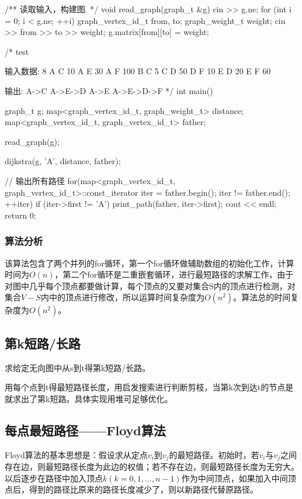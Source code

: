\begin{Codex}[label=al_graph_dijkstra.cpp]
/** 读取输入，构建图. */
void read_graph(graph_t &g) {
    cin >> g.ne;
    for (int i = 0; i < g.ne; ++i) {
        graph_vertex_id_t from, to;
        graph_weight_t weight;
        cin >> from >> to >> weight;
        g.matrix[from][to] = weight;
    }
}

/* test

输入数据:
8
A C 10
A E 30
A F 100
B C 5
C D 50
D F 10
E D 20
E F 60

输出:
A->C
A->E->D
A->E
A->E->D->F
*/
int main() {
    graph_t g;
    map<graph_vertex_id_t, graph_weight_t> distance;
    map<graph_vertex_id_t, graph_vertex_id_t> father;

    read_graph(g);

    dijkstra(g, 'A', distance, father);

    // 输出所有路径
    for(map<graph_vertex_id_t, graph_vertex_id_t>::const_iterator iter =
            father.begin(); iter != father.end();  ++iter) {
        if (iter->first != 'A') {
            print_path(father, iter->first);
            cout << endl;
        }
    }
    return 0;
}
\end{Codex}

\subsubsection{算法分析}
该算法包含了两个并列的for循环，第一个for循环做辅助数组的初始化工作，计算时间为$O(n)$，第二个for循环是二重嵌套循环，进行最短路径的求解工作，由于对图中几乎每个顶点都要做计算，每个顶点的又要对集合S内的顶点进行检测，对集合$V-S$内中的顶点进行修改，所以运算时间复杂度为$O(n^2)$。算法总的时间复杂度为$O(n^2)$。

\subsection{第k短路/长路}
求给定无向图中从s到t得第k短路/长路。

用每个点到t得最短路径长度，用启发搜索进行判断剪枝，当第k次到达t的节点是就求出了第k短路。具体实现用堆可足够优化。

\subsection{每点最短路径——Floyd算法}
Floyd算法的基本思想是：假设求从定点$v_i$到$v_j$的最短路径。初始时，若$v_i$与$v_j$之间存在边，则最短路径长度为此边的权值；若不存在边，则最短路径长度为无穷大。以后逐步在路径中加入顶点$k(k=0,1,...,n-1)$作为中间顶点，如果加入中间顶点后，得到的路径比原来的路径长度减少了，则以新路径代替原路径。

